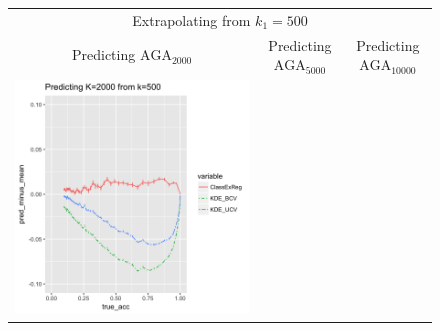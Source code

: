 \documentclass[twoside,11pt]{article}
\newenvironment{myfont}{\fontfamily{phv}\selectfont}{\par}
\begin{document}
\begin{figure}[p]
\centering
\begin{tabular}{ccc}
\multicolumn{3}{c}{\begin{myfont}Extrapolating from $k_1 = 500$\end{myfont}}\\
\begin{myfont}Predicting $\text{AGA}_{2000}$\end{myfont} &
\begin{myfont}Predicting $\text{AGA}_{5000}$\end{myfont} &
\begin{myfont}Predicting $\text{AGA}_{10000}$\end{myfont}\\
\includegraphics[scale = 0.45, clip = true, trim = .22in 0 1.23in 0.4in]{sim_large7_biaz_K2_k0_5.png} &

\end{tabular}
\end{figure}
\end{document}
